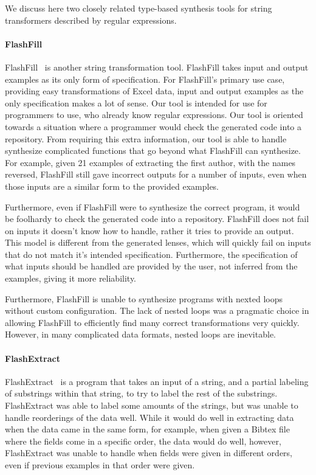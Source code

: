 \documentclass[numbers,10pt,preprint\ifanon ,nocopyrightspace\fi]{sigplanconf}
\begin{document}
We discuss here two closely related type-based synthesis tools for string
transformers described by regular expressions.

\paragraph*{FlashFill}
FlashFill~\cite{gulwani-popl-2014} is another string transformation
tool.  FlashFill takes input and 
output examples as its only form of specification.  For FlashFill's primary use
case, providing easy transformations of Excel data, input and output examples as
the only specification makes a lot of sense.  Our tool is intended for use for
programmers to use, who already know regular expressions.  Our tool is oriented
towards a situation where a programmer would check the generated code into a
repository.  From requiring this extra information, our tool is able to handle
synthesize complicated functions that go beyond what FlashFill can synthesize.
For example, given 21 examples of extracting the first author, with the names
reversed, FlashFill still gave incorrect outputs for a number of inputs, even
when those inputs are a similar form to the provided examples.

Furthermore, even if FlashFill were to synthesize the correct program, it would
be foolhardy to check the generated code into a repository.  FlashFill does not
fail on inputs it doesn't know how to handle, rather it tries to provide an
output.  This model is different from the generated lenses, which will quickly
fail on inputs that do not match it's intended specification.  Furthermore, the
specification of what inputs should be handled are provided by the user, not
inferred from the examples, giving it more reliability.

Furthermore, FlashFill is unable to synthesize programs with nexted loops
without custom configuration.  The lack of nested loops was a pragmatic choice
in allowing FlashFill
to efficiently find many correct transformations very quickly.  However, in
many complicated data formats, nested loops are inevitable. 

\paragraph*{FlashExtract}
FlashExtract~\cite{le-pldi-2014} is a program that takes an input of a string, and a partial
labeling of substrings within that string, to try to label the rest of the
substrings.  FlashExtract was able to label some amounts of the strings, but was
unable to handle reorderings of the data well.  While it would do well in
extracting data when the data came in the same form, for example, when given a
Bibtex file where the fields come in a specific order, the data would do well,
however, FlashExtract was unable to handle when fields were given in different
orders, even if previous examples in that order were given.
\end{document}
